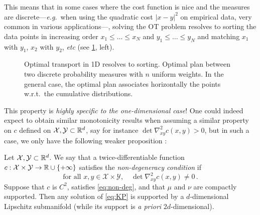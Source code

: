         \begin{remark}[OT in 1d is sorting]
            This means that in some cases where the cost function is nice and the measures are discrete---\textit{e.g.}~when using the quadratic cost $|x-y|^2$ on empirical data, very common in various applications---, solving the OT problem resolves to sorting the data points in increasing order $x_1\leq \dots\leq x_N$ and $y_1\leq \dots\leq y_N$ and matching $x_1$ with $y_1$, $x_2$ with $y_2$, \textit{etc} (see \cref{fig:1d-sort}, left).
            \begin{figure}[!h]
                \centering
                \begin{subfigure}{.49\textwidth}
                    
                \end{subfigure}
                \begin{subfigure}{.49\textwidth}
                    \begin{subfigure}{.49\textwidth}
                        
                    \end{subfigure}
                    \begin{subfigure}{.49\textwidth}
                        
                    \end{subfigure}
                \end{subfigure}
                \caption[Optimal transport in 1D resolves to sorting.]{Optimal transport in 1D resolves to sorting. \capleft Optimal plan between two discrete probability measures with $n$ uniform weights. \capright In the general case, the optimal plan associates horizontally the points w.r.t.~the cumulative distributions.}
                \label{fig:1d-sort}
            \end{figure}
        \end{remark}
        This property is \emph{highly specific to the one-dimensional case}! One could indeed expect to obtain similar monotonicity results when assuming a similar property on $c$ defined on $\mathcal{X},\mathcal{Y}\subset\mathbb{R}^d$, say for instance $\det \nabla^2_{xy}c(x,y)>0$, but in such a case, we only have the following weaker proposition \cite{mccann2012rectifiability}:
        \begin{proposition}
            Let $\mathcal{X},\mathcal{Y}\subset\mathbb{R}^d$. We say that a twice-differentiable function $c:\mathcal{X}\times\mathcal{Y}\to\mathbb{R}\cup \{ +\infty \}$ satisfies the \emph{non-degeneracy condition} if
            \begin{equation}
                \tag{Non-deg}
                \text{for all } x,y\in \mathcal X\times \mathcal Y,\quad \det \nabla^2_{xy}c(x,y)\neq0\,.
                \label{eq:non-deg}
            \end{equation}
            Suppose that $c$ is $C^2$, satisfies \cref{eq:non-deg}, and that $\mu$ and $\nu$ are compactly supported. Then any solution of \cref{eq:KP} is supported by a $d$-dimensional Lipschitz submanifold (while its support is \textit{a priori} $2d$-dimensional).
        \end{proposition}

